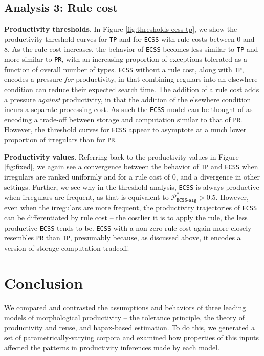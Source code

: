 \documentclass[
   11pt,
       ]{book}
\begin{document}
\hypertarget{analysis-3-rule-cost}{%
\subsection{Analysis 3: Rule cost}\label{analysis-3-rule-cost}}

\textbf{Productivity thresholds}. In Figure \ref{fig:thresholds-ecss-tp}, we show the
productivity threshold curves for \texttt{TP} and for \texttt{ECSS} with rule costs between 0
and 8. As the rule cost increases, the behavior of
\texttt{ECSS} becomes less similar to \texttt{TP} and more similar to \texttt{PR}, with an increasing
proportion of exceptions tolerated as a function of overall number of types.
\texttt{ECSS} without a rule cost, along with \texttt{TP}, encodes a pressure \emph{for}
productivity, in that combining regulars into an elsewhere condition can reduce
their expected search time. The addition of a rule cost adds a pressure
\emph{against} productivity, in that the addition of the elsewhere condition incurs a
separate processing cost. As such the \texttt{ECSS} model can be thought of as encoding
a trade-off between storage and computation similar to that of \texttt{PR}. However,
the threshold curves for \texttt{ECSS} appear to asymptote at a much lower proportion
of irregulars than for \texttt{PR}.

\textbf{Productivity values}. Referring back to the productivity values in Figure
\ref{fig:fixed}, we again see a convergence between the behavior of \texttt{TP} and
\texttt{ECSS} when irregulars are ranked uniformly and for a rule cost of 0, and a
divergence in other settings. Further, we see why in the threshold analysis,
\texttt{ECSS} is always productive when irregulars are frequent, as that is equivalent
to \(\mathcal{P}^*_{\texttt{ECSS-sig}}>0.5\). However, even when the irregulars
are more frequent, the productivity trajectories of \texttt{ECSS} can be differentiated
by rule cost -- the costlier it is to apply the rule, the less productive \texttt{ECSS}
tends to be. \texttt{ECSS} with a non-zero rule cost again more closely resembles \texttt{PR}
than \texttt{TP}, presumably because, as discussed above, it encodes a version of
storage-computation tradeoff.

\hypertarget{prod-comp-conclusion}{%
\section{Conclusion}\label{prod-comp-conclusion}}

We compared and contrasted the assumptions and behaviors of three leading models
of morphological productivity -- the tolerance principle, the theory of
productivity and reuse, and hapax-based estimation. To do this, we generated a
set of parametrically-varying corpora and examined how properties of this
inputs affected the patterns in productivity inferences made by each model.
\end{document}
